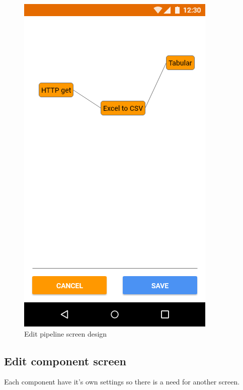 \begin{figure}
\begin{minipage}[b]{0.32\textwidth}
    	\includegraphics[width=\textwidth]{pics/xd/Pipeline editor.png}
    	\caption[Edit pipeline screen]{Edit pipeline screen design}\label{fig:xdPipelineEditor}
    \end{minipage}
\end{figure}



\subsection{Edit component screen}
Each component have it's own settings so there is a need for another screen.

